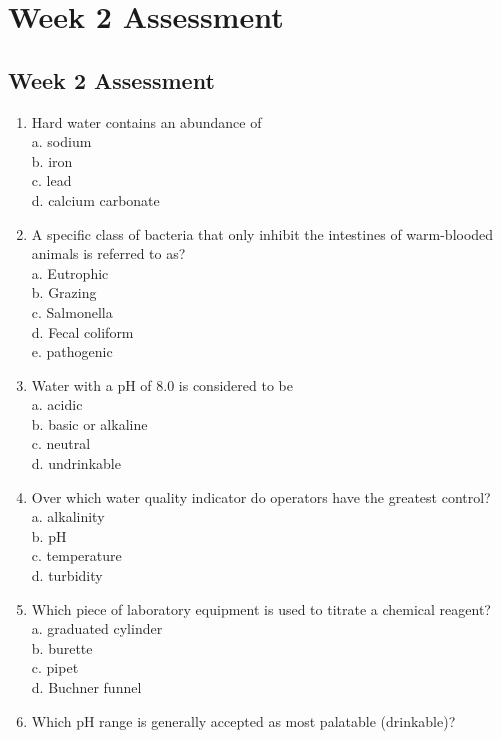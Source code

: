 
\chapter{Week 2 Assessment}
\section{Week 2 Assessment}
\begin{enumerate}[1.]

\item Hard water contains an abundance of\\
a. sodium\\
b. iron\\
c. lead\\
d. calcium carbonate\\
\item A specific class of bacteria that only inhibit the intestines of warm-blooded animals is referred to as?\\
a. Eutrophic\\
b. Grazing\\
c. Salmonella\\
d. Fecal coliform\\
e. pathogenic\\
\item Water with a pH of 8.0 is considered to be\\
a. acidic\\
b. basic or alkaline\\
c. neutral\\
d. undrinkable\\
\item Over which water quality indicator do operators have the greatest control?\\
a. alkalinity\\
b. pH\\
c. temperature\\
d. turbidity\\
\item Which piece of laboratory equipment is used to titrate a chemical reagent?\\
a. graduated cylinder\\
b. burette\\
c. pipet\\
d. Buchner funnel\\
\item Which pH range is generally accepted as most palatable (drinkable)?\\

\end{enumerate}
